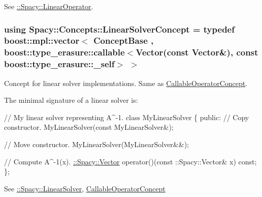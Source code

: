 See \hyperlink{group__SpacyGroup_ga584f7b9d82a844302ba0d77c3a1b6640_LinearOperatorAnchor}{\+:\+:Spacy\+:\+:Linear\+Operator}. \hypertarget{group__ConceptGroup_gac7d6a94c7131c8613e2ab26fddeb50bd_gac7d6a94c7131c8613e2ab26fddeb50bd}{}
\subsubsection[{Linear\+Solver\+Concept}]{\setlength{\rightskip}{0pt plus 5cm}using {\bf Spacy\+::\+Concepts\+::\+Linear\+Solver\+Concept} = typedef boost\+::mpl\+::vector$<$ Concept\+Base , boost\+::type\+\_\+erasure\+::callable$<$Vector(const Vector\&), const boost\+::type\+\_\+erasure\+::\+\_\+self$>$ $>$}\label{group__ConceptGroup_gac7d6a94c7131c8613e2ab26fddeb50bd_gac7d6a94c7131c8613e2ab26fddeb50bd}


Concept for linear solver implementations. Same as \hyperlink{group__ConceptGroup_gadec0c664abaacc2065dadd8b11cc8d30_CallableOperatorConceptAnchor}{Callable\+Operator\+Concept}. 

\label{group__ConceptGroup_gac7d6a94c7131c8613e2ab26fddeb50bd_LinearSolverConceptAnchor}%
\hypertarget{group__ConceptGroup_gac7d6a94c7131c8613e2ab26fddeb50bd_LinearSolverConceptAnchor}{}%
The minimal signature of a linear solver is\+: 
\begin{DoxyCode}
\textcolor{comment}{// My linear solver representing A^-1.}
\textcolor{keyword}{class }MyLinearSolver
\{
\textcolor{keyword}{public}:
  \textcolor{comment}{// Copy constructor.}
  MyLinearSolver(\textcolor{keyword}{const} MyLinearSolver&);

  \textcolor{comment}{// Move constructor.}
  MyLinearSolver(MyLinearSolver&&);

  \textcolor{comment}{// Compute A^-1(x).}
  \hyperlink{classSpacy_1_1Vector}{::Spacy::Vector} operator()(const ::Spacy::Vector& x) \textcolor{keyword}{const};
\};
\end{DoxyCode}


See \hyperlink{namespaceSpacy_a7d5cd1c6fb9dd85aa345b536caf30bba_LinearSolverAnchor}{\+:\+:Spacy\+:\+:Linear\+Solver}, \hyperlink{group__ConceptGroup_gadec0c664abaacc2065dadd8b11cc8d30_CallableOperatorConceptAnchor}{Callable\+Operator\+Concept} \hypertarget{group__ConceptGroup_ga6b5c97b0e58318ef98c43a9b8a7dae08_ga6b5c97b0e58318ef98c43a9b8a7dae08}{}
